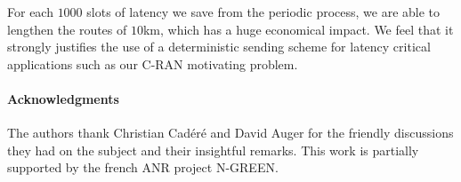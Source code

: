 \documentclass[a4paper,10pt]{IEEEtran}
\newcommand\pazl{\textsc{pazl}\xspace}
\newcommand\pall{\textsc{pall}\xspace}
\begin{document}
     For each $1000$ slots of latency we save from the periodic process, we are able to lengthen the routes of $10$km, which has a huge economical impact. We feel that it strongly justifies the use of a deterministic sending scheme for latency critical applications such as our C-RAN motivating problem.     
% 
% 
%    
% 
% 

 \paragraph*{Acknowledgments} The authors thank Christian Cad\'er\'e and David Auger for the friendly discussions
 they had on the subject and their insightful remarks. This work is partially supported by the french ANR project N-GREEN.



\end{document}
